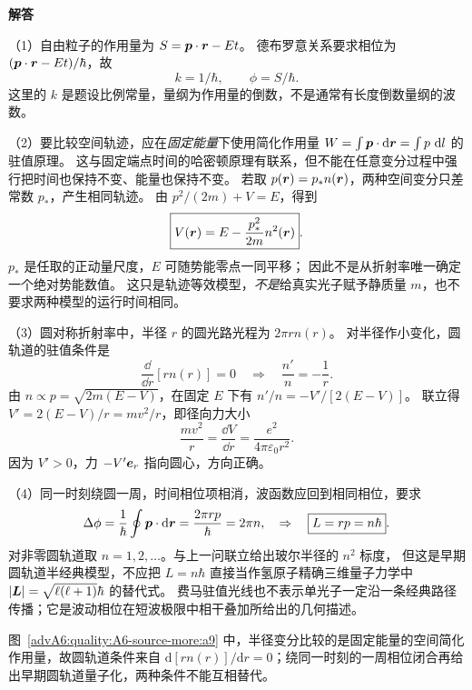 \begin{advsolution}
\begin{center}\begin{minipage}{.96\linewidth}\centering
\raggedright{\bfseries\color{DeepBlue}解答}\par\smallskip\centering

\label{advA6:quality:A6-source-more:a9}
\end{minipage}\end{center}

（1）自由粒子的作用量为 $S=\bm{p}\cdot\bm{r}-Et$。
德布罗意关系要求相位为 $(\bm{p}\cdot\bm{r}-Et)/\hbar$，故
\[
 \boxed{k=1/\hbar},\qquad \phi=S/\hbar.
\]
这里的 $k$ 是题设比例常量，量纲为作用量的倒数，不是通常有长度倒数量纲的波数。

（2）要比较空间轨迹，应在\emph{固定能量}下使用简化作用量
$W=\int\bm{p}\cdot\mathop{}\!\mathrm d\bm{r}=\int p\,\mathop{}\!\mathrm d l$ 的驻值原理。
这与固定端点时间的哈密顿原理有联系，但不能在任意变分过程中强行把时间也保持不变、能量也保持不变。
若取 $p(\bm{r})=p_*n(\bm{r})$，两种空间变分只差常数 $p_*$，产生相同轨迹。
由 $p^2/(2m)+V=E$，得到
\[
 \boxed{V(\bm{r})=E-\frac{p_*^2}{2m}n^2(\bm{r})}.
\]
$p_*$ 是任取的正动量尺度，$E$ 可随势能零点一同平移；
因此不是从折射率唯一确定一个绝对势能数值。
这只是轨迹等效模型，\emph{不是}给真实光子赋予静质量 $m$，也不要求两种模型的运行时间相同。

（3）圆对称折射率中，半径 $r$ 的圆光路光程为 $2\pi r n(r)$。
对半径作小变化，圆轨道的驻值条件是
\[
 \frac{\dd}{\dd r}[r n(r)]=0
 \quad\Rightarrow\quad \frac{n'}n=-\frac1r.
\]
由 $n\propto p=\sqrt{2m(E-V)}$，在固定 $E$ 下有
$n'/n=-V'/[2(E-V)]$。
联立得 $V'=2(E-V)/r=mv^2/r$，即径向力大小
\[
 \boxed{\frac{mv^2}{r}=\frac{\dd V}{\dd r}
 =\frac{e^2}{4\pi\varepsilon_0r^2}}.
\]
因为 $V'>0$，力 $-V'\bm{e}_r$ 指向圆心，方向正确。

（4）同一时刻绕圆一周，时间相位项相消，波函数应回到相同相位，要求
\[
 \Delta\phi=\frac1\hbar\oint\bm{p}\cdot\mathop{}\!\mathrm d\bm{r}
 =\frac{2\pi r p}{\hbar}=2\pi n,
 \quad\Rightarrow\quad\boxed{L=rp=n\hbar}.
\]
对非零圆轨道取 $n=1,2,\ldots$。与上一问联立给出玻尔半径的 $n^2$ 标度，
但这是早期圆轨道半经典模型，不应把 $L=n\hbar$ 直接当作氢原子精确三维量子力学中
$|\bm{L}|=\sqrt{\ell(\ell+1)}\hbar$ 的替代式。
费马驻值光线也不表示单光子一定沿一条经典路径传播；它是波动相位在短波极限中相干叠加所给出的几何描述。

图~\ref{advA6:quality:A6-source-more:a9} 中，半径变分比较的是固定能量的空间简化作用量，故圆轨道条件来自 $\mathrm d[rn(r)]/\mathrm dr=0$；绕同一时刻的一周相位闭合再给出早期圆轨道量子化，两种条件不能互相替代。
\end{advsolution}
